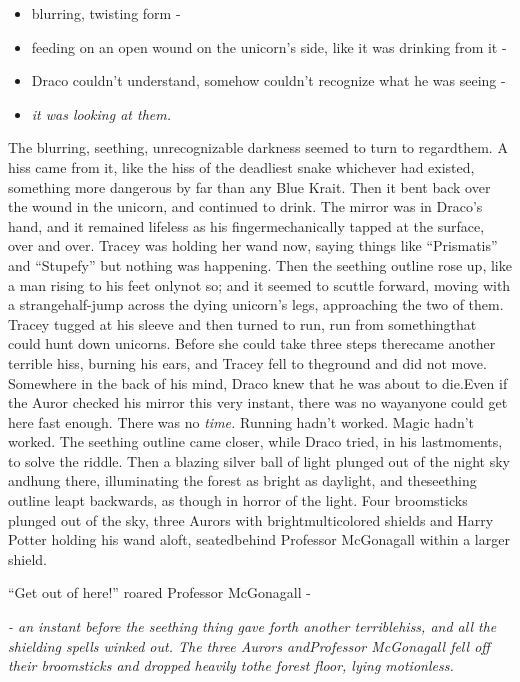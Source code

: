\begin{itemize}
\item
  blurring, twisting form -
\item
  feeding on an open wound on the unicorn's side, like it was drinking
  from it -
\item
  Draco couldn't understand, somehow couldn't recognize what he was
  seeing -
\item
  \emph{it was looking at them.}
\end{itemize}
The blurring, seething, unrecognizable darkness seemed to turn to regardthem. A hiss came from it, like the hiss of the deadliest snake whichever had existed, something more dangerous by far than any Blue Krait.
Then it bent back over the wound in the unicorn, and continued to drink.
The mirror was in Draco's hand, and it remained lifeless as his fingermechanically tapped at the surface, over and over.
Tracey was holding her wand now, saying things like ``Prismatis'' and
``Stupefy'' but nothing was happening.
Then the seething outline rose up, like a man rising to his feet onlynot so; and it seemed to scuttle forward, moving with a strangehalf-jump across the dying unicorn's legs, approaching the two of them.
Tracey tugged at his sleeve and then turned to run, run from somethingthat could hunt down unicorns. Before she could take three steps therecame another terrible hiss, burning his ears, and Tracey fell to theground and did not move.
Somewhere in the back of his mind, Draco knew that he was about to die.Even if the Auror checked his mirror this very instant, there was no wayanyone could get here fast enough. There was no \emph{time.}
Running hadn't worked.
Magic hadn't worked.
The seething outline came closer, while Draco tried, in his lastmoments, to solve the riddle.
Then a blazing silver ball of light plunged out of the night sky andhung there, illuminating the forest as bright as daylight, and theseething outline leapt backwards, as though in horror of the light.
Four broomsticks plunged out of the sky, three Aurors with brightmulticolored shields and Harry Potter holding his wand aloft, seatedbehind Professor McGonagall within a larger shield.

``Get out of here!'' roared Professor McGonagall -

\emph{- an instant before the seething thing gave forth another terriblehiss, and all the shielding spells winked out. The three Aurors andProfessor McGonagall fell off their broomsticks and dropped heavily tothe forest floor, lying motionless.}

